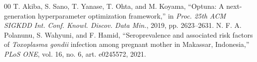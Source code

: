 \documentclass[conference]{IEEEtran}
\begin{document}
\begin{thebibliography}{00}
 T. Akiba, S. Sano, T. Yanase, T. Ohta, and M. Koyama, ``Optuna: A next-generation hyperparameter optimization framework,'' in \emph{Proc. 25th ACM SIGKDD Int. Conf. Knowl. Discov. Data Min.}, 2019, pp. 2623--2631.
 N. F. A. Polanunu, S. Wahyuni, and F. Hamid, ``Seroprevalence and associated risk factors of \emph{Toxoplasma gondii} infection among pregnant mother in Makassar, Indonesia,'' \emph{PLoS ONE}, vol. 16, no. 6, art. e0245572, 2021.
\end{thebibliography}
\end{document}
